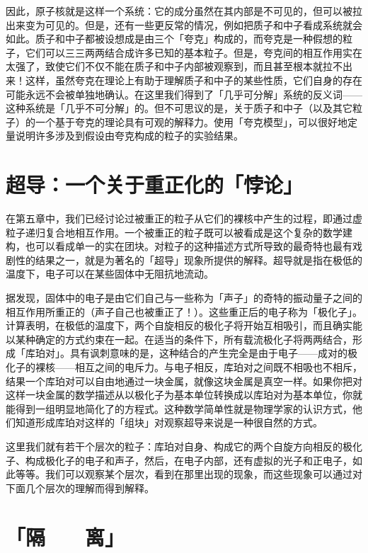 \documentclass[
  12pt,
  twoside,
  openright,
  oldfontcommands,
]{memoir}
\begin{document}
因此，原子核就是这样一个系统：它的成分虽然在其内部是不可见的，但可以被拉出来变为可见的。但是，还有一些更反常的情况，例如把质子和中子看成系统就会如此。质子和中子都被设想成是由三个「夸克」构成的，而夸克是一种假想的粒子，它们可以三三两两结合成许多已知的基本粒子。但是，夸克间的相互作用实在太强了，致使它们不仅不能在质子和中子内部被观察到，而且甚至根本就拉不出来！这样，虽然夸克在理论上有助于理解质子和中子的某些性质，它们自身的存在可能永远不会被单独地确认。在这里我们得到了「几乎可分解」系统的反义词------这种系统是「几乎不可分解」的。但不可思议的是，关于质子和中子（以及其它粒子）的一个基于夸克的理论具有可观的解释力。使用「夸克模型」，可以很好地定量说明许多涉及到假设由夸克构成的粒子的实验结果。

\section{超导：一个关于重正化的「悖论」}

在第五章中，我们已经讨论过被重正的粒子从它们的裸核中产生的过程，即通过虚粒子递归复合地相互作用。一个被重正的粒子既可以被看成是这个复杂的数学建构，也可以看成单一的实在团块。对粒子的这种描述方式所导致的最奇特也最有戏剧性的结果之一，就是为著名的「超导」现象所提供的解释。超导就是指在极低的温度下，电子可以在某些固体中无阻抗地流动。

据发现，固体中的电子是由它们自己与一些称为「声子」的奇特的振动量子之间的相互作用所重正的（声子自己也被重正了！）。这些重正后的电子称为「极化子」。计算表明，在极低的温度下，两个自旋相反的极化子将开始互相吸引，而且确实能以某种确定的方式约束在一起。在适当的条件下，所有载流极化子将两两结合，形成「库珀对」。具有讽刺意味的是，这种结合的产生完全是由于电子------成对的极化子的裸核------相互之间的电斥力。与电子相反，库珀对之间既不相吸也不相斥，结果一个库珀对可以自由地通过一块金属，就像这块金属是真空一样。如果你把对这样一块金属的数学描述从以极化子为基本单位转换成以库珀对为基本单位，你就能得到一组明显地简化了的方程式。这种数学简单性就是物理学家的认识方式，他们知道形成库珀对这样的「组块」对观察超导来说是一种很自然的方式。

这里我们就有若干个层次的粒子：库珀对自身、构成它的两个自旋方向相反的极化子、构成极化子的电子和声子，然后，在电子内部，还有虚拟的光子和正电子，如此等等。我们可以观察某个层次，看到在那里出现的现象，而这些现象可以通过对下面几个层次的理解而得到解释。

\section{「隔　　离」}
\end{document}

